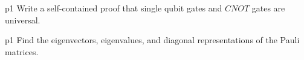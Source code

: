 \documentclass[a4paper, 11pt]{article}
\begin{document}
\begin{problem}{%
	}{p1%
	}
	Write a self-contained proof that single qubit gates and $CNOT$ gates are universal.
\end{problem}

\solve{
}



\begin{problem}{%
	}{p1%
	}
	Find the eigenvectors, eigenvalues, and diagonal representations of the Pauli matrices.		
\end{problem}

\solve{
}

	
\end{document}
